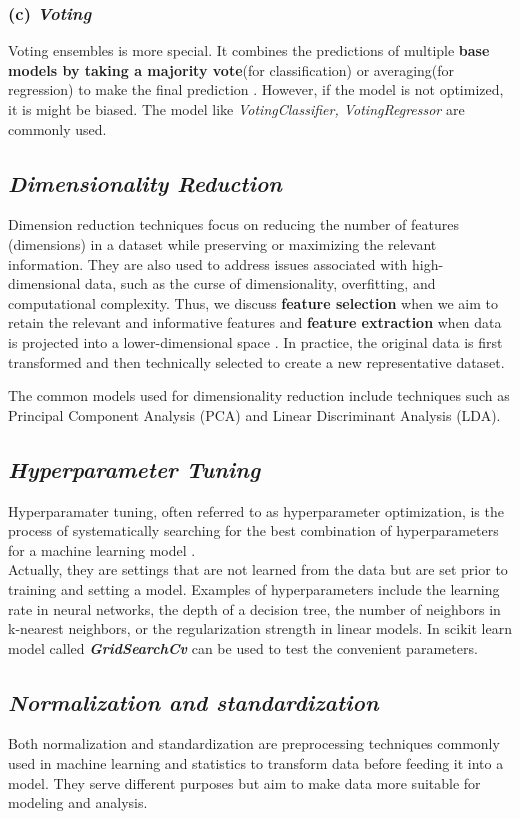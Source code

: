 \documentclass[12pt,a4paper, oneside]{book}
\begin{document}
\subsubsection{(c) \textit{Voting}} 
Voting ensembles is more special. It combines the predictions of multiple \textbf{base models by taking a majority vote}(for classification) or averaging(for regression) to make the final prediction \cite{kabari2019comparison}. However, if the model is not optimized, it is might be biased. The model like \textit{VotingClassifier, VotingRegressor} are commonly used. 
\subsection*{\textit{Dimensionality Reduction}}
Dimension reduction techniques focus on reducing the number of features (dimensions) in a dataset while preserving or maximizing the relevant information. They are also used to address issues associated with high-dimensional data, such as the curse of dimensionality, overfitting, and computational complexity. Thus, we discuss \textbf{feature selection} when we aim to retain the relevant and informative features and \textbf{feature extraction} when data is projected into a lower-dimensional space \cite{cunningham2008dimension}. In practice, the original data is first transformed and then technically selected to create a new representative dataset. 

The common models used for dimensionality reduction include techniques such as Principal Component Analysis (PCA) and Linear Discriminant Analysis (LDA).
\subsection*{\textit{Hyperparameter Tuning}} 
Hyperparamater tuning, often referred to as hyperparameter optimization, is the process of systematically searching for the best combination of hyperparameters for a machine learning model  \cite{chauhan2020detection}.\\

Actually, they are settings that are not learned from the data but are set prior to training and setting a model. Examples of hyperparameters include the learning rate in neural networks, the depth of a decision tree, the number of neighbors in k-nearest neighbors, or the regularization strength in linear models. In scikit learn model called \textit{\textbf{GridSearchCv}} can be used to test the convenient parameters. 

\subsection*{\textit{Normalization and standardization}} 
Both normalization and standardization are preprocessing techniques commonly used in machine learning and statistics to transform data before feeding it into a model. They serve different purposes but aim to make data more suitable for modeling and analysis. \\
\end{document}
